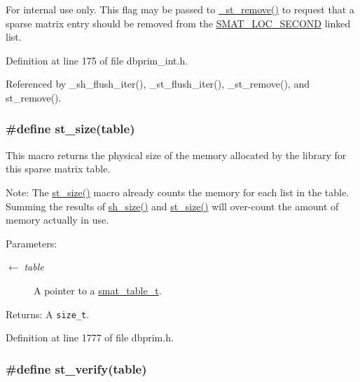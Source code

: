 \begin{Desc}
\item[For internal use only.]
This flag may be passed to \hyperlink{group__dbprim__smat_ga24}{\_\-st\_\-remove()} to request that a sparse matrix entry should be removed from the \hyperlink{group__dbprim__smat_gga70a138}{SMAT\_\-LOC\_\-SECOND} linked list.\end{Desc}


Definition at line 175 of file dbprim\_\-int.h.

Referenced by \_\-sh\_\-flush\_\-iter(), \_\-st\_\-flush\_\-iter(), \_\-st\_\-remove(), and st\_\-remove().\hypertarget{group__dbprim__smat_ga40}{
\subsubsection[st\_\-size]{\setlength{\rightskip}{0pt plus 5cm}\#define st\_\-size(table)}}
\label{group__dbprim__smat_ga40}


This macro returns the physical size of the memory allocated by the library for this sparse matrix table.

\begin{Desc}
\item[Note:]The \hyperlink{group__dbprim__smat_ga40}{st\_\-size()} macro already counts the memory for each list in the table. Summing the results of \hyperlink{group__dbprim__smat_ga53}{sh\_\-size()} and \hyperlink{group__dbprim__smat_ga40}{st\_\-size()} will over-count the amount of memory actually in use.\end{Desc}
\begin{Desc}
\item[Parameters:]
\begin{description}
\item[\mbox{$\leftarrow$} {\em table}]A pointer to a \hyperlink{group__dbprim__smat_ga0}{smat\_\-table\_\-t}.\end{description}
\end{Desc}
\begin{Desc}
\item[Returns:]A {\tt size\_\-t}.\end{Desc}


Definition at line 1777 of file dbprim.h.\hypertarget{group__dbprim__smat_ga34}{
\subsubsection[st\_\-verify]{\setlength{\rightskip}{0pt plus 5cm}\#define st\_\-verify(table)}}
\label{group__dbprim__smat_ga34}


